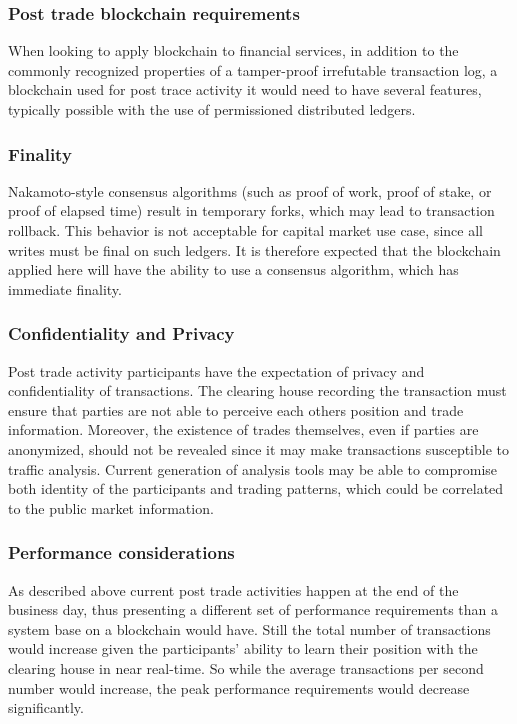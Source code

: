 \subsubsection{Post trade blockchain requirements}

When looking to apply blockchain to financial services, in addition to the commonly recognized properties of a tamper-proof irrefutable transaction log, a blockchain used for post trace activity it would need to have several features, typically possible with the use of permissioned distributed ledgers.

\subsubsection{Finality}

Nakamoto-style consensus algorithms (such as proof of work, proof of stake, or proof of elapsed time) result in temporary forks, which may lead to transaction rollback. This behavior is not acceptable for capital market use case, since all writes must be final on such ledgers. It is therefore expected that the blockchain applied here will have the ability to use a consensus algorithm, which has immediate finality.

\subsubsection{Confidentiality and Privacy}

Post trade activity participants have the expectation of privacy and confidentiality of transactions. The clearing house recording the transaction must ensure that parties are not able to perceive each others position and trade information. Moreover, the existence of trades themselves, even if parties are anonymized, should not be revealed since it may make transactions susceptible to traffic analysis. Current generation of analysis tools may be able to compromise both identity of the participants and trading patterns, which could be correlated to the public market information.

\subsubsection{Performance considerations}

As described above current post trade activities happen at the end of the business day, thus presenting a different set of performance requirements than a system base on a blockchain would have. Still the total number of transactions would increase given the participants' ability to learn their position with the clearing house in near real-time. So while the average transactions per second number would increase, the peak performance requirements would decrease significantly.

